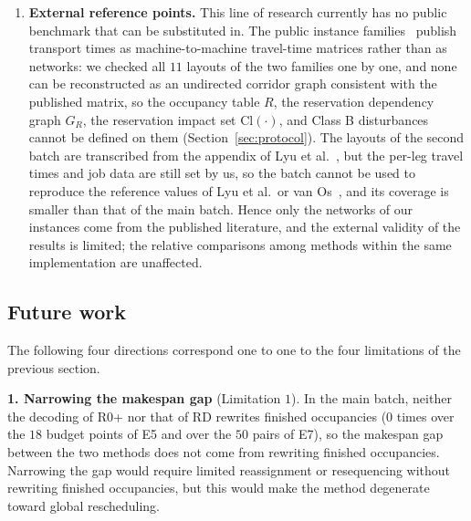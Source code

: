 \documentclass[manuscript,screen,review]{acmart}
\newcommand{\NPairs}{50}
\begin{document}
\begin{enumerate}[leftmargin=1.6em,itemsep=0.35em]
\item \textbf{External reference points.} This line of research currently has no public benchmark that can be substituted in.
The public instance families~\cite{homayouni2021production,fontes2023hybrid} publish transport times as machine-to-machine travel-time matrices rather than as networks:
we checked all \(11\) layouts of the two families one by one, and none can be reconstructed as an undirected corridor graph consistent with the published matrix,
so the occupancy table \(R\), the reservation dependency graph \(G_R\), the reservation impact set \(\mathrm{Cl}(\cdot)\), and Class B disturbances cannot be defined on them (Section~\ref{sec:protocol}).
The layouts of the second batch are transcribed from the appendix of Lyu et al.~\cite{lyu2019approach}, but the per-leg travel times and job data are still set by us,
so the batch cannot be used to reproduce the reference values of Lyu et al.\ or van Os~\cite{vanos2026exact}, and its coverage is smaller than that of the main batch.
Hence only the networks of our instances come from the published literature, and the external validity of the results is limited; the relative comparisons among methods within the same implementation are unaffected.
\end{enumerate}

\subsection{Future work}
\label{sec:future}

The following four directions correspond one to one to the four limitations of the previous section.

\textbf{1. Narrowing the makespan gap} (Limitation \(1\)).
In the main batch, neither the decoding of R0+ nor that of RD rewrites finished occupancies (\(0\) times over the \(18\) budget points of E5 and over the \(\NPairs\) pairs of E7),
so the makespan gap between the two methods does not come from rewriting finished occupancies.
Narrowing the gap would require limited reassignment or resequencing without rewriting finished occupancies, but this would make the method degenerate toward global rescheduling.
\end{document}
